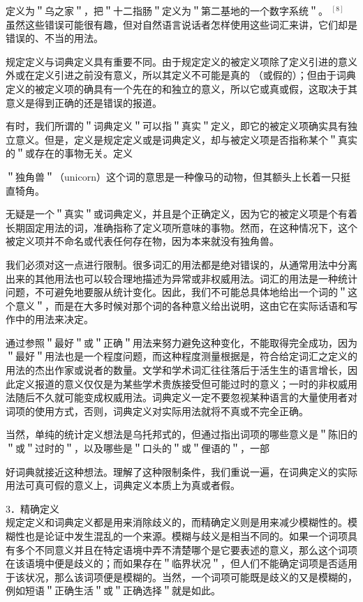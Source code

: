 定义为＂乌之家＂，把＂十二指肠＂定义为＂第二基地的一个数字系统＂。 ${ }^{[8]}$ 虽然这些错误可能很有趣，但对自然语言说话者怎样使用这些词汇来讲，它们却是错误的、不当的用法。

规定定义与词典定义具有重要不同。由于规定定义的被定义项除了定义引进的意义外或在定义引进之前没有意义，所以其定义不可能是真的 （或假的）；但由于词典定义的被定义项的确具有一个先在的和独立的意义，所以它或真或假，这取决于其意义是得到正确的还是错误的报道。

有时，我们所谓的＂词典定义＂可以指＂真实＂定义，即它的被定义项确实具有独立意义。但是，定义是规定定义或是词典定义，却与被定义项是否指称某个＂真实的＂或存在的事物无关。定义

\begin{displayquote}
＂独角兽＂（unicorn）这个词的意思是一种像马的动物，但其额头上长着一只挺直犄角。
\end{displayquote}

无疑是一个＂真实＂或词典定义，并且是个正确定义，因为它的被定义项是个有着长期固定用法的词，准确指称了定义项所意味的事物。然而，在这种情况下，这个被定义项并不命名或代表任何存在物，因为本来就没有独角兽。

我们必须对这一点进行限制。很多词汇的用法都是绝对错误的，从通常用法中分离出来的其他用法也可以较合理地描述为异常或非权威用法。词汇的用法是一种统计问题，不可避免地要服从统计变化。因此，我们不可能总具体地给出一个词的＂这个意义＂，而是在大多时候对那个词的各种意义给出说明，这由它在实际话语和写作中的用法来决定。

通过参照＂最好＂或＂正确＂用法来努力避免这种变化，不能取得完全成功，因为＂最好＂用法也是一个程度问题，而这种程度测量根据是，符合给定词汇之定义的用法的杰出作家或说者的数量。文学和学术词汇往往落后于活生生的语言增长，因此定义报道的意义仅仅是为某些学术贵族接受但可能过时的意义；一时的非权威用法随后不久就可能变成权威用法。词典定义一定不要忽视某种语言的大量使用者对词项的使用方式，否则，词典定义对实际用法就将不真或不完全正确。

当然，单纯的统计定义想法是乌托邦式的，但通过指出词项的哪些意义是＂陈旧的＂或＂过时的＂，以及哪些是＂口头的＂或＂俚语的＂，一部

好词典就接近这种想法。理解了这种限制条件，我们重说一遍，在词典定义的实际用法可真可假的意义上，词典定义本质上为真或者假。

3．精确定义\\
规定定义和词典定义都是用来消除歧义的，而精确定义则是用来减少模糊性的。模糊性也是论证中发生混乱的一个来源。模糊与歧义是相当不同的。如果一个词项具有多个不同意义并且在特定语境中弄不清楚哪个是它要表述的意义，那么这个词项在该语境中便是歧义的；而如果存在＂临界状况＂，但人们不能确定词项是否适用于该状况，那么该词项便是模糊的。当然，一个词项可能既是歧义的又是模糊的，例如短语＂正确生活＂或＂正确选择＂就是如此。

